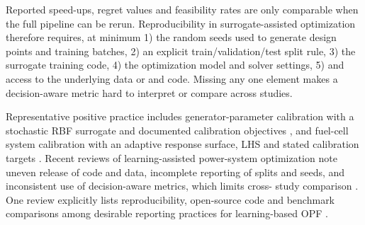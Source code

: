 Reported speed-ups, regret values and feasibility rates are only
comparable when the full pipeline can be rerun. Reproducibility in
surrogate-assisted optimization therefore requires, at minimum 1) the
random seeds used to generate design points and training batches, 2) an
explicit train/validation/test split rule, 3) the surrogate training
code, 4) the optimization model and solver settings, 5) and access to
the underlying data or and code. Missing any one element makes a
decision-aware metric hard to interpret or compare across studies.

Representative positive practice includes generator-parameter
calibration with a stochastic RBF surrogate and documented calibration
objectives \cite{Khazeiynasab2021}, and fuel-cell system calibration with an
adaptive response surface, LHS and stated calibration targets
\cite{Zhang2025__7}. Recent reviews of learning-assisted power-system
optimization note uneven release of code and data, incomplete reporting
of splits and seeds, and inconsistent use of decision-aware metrics,
which limits cross- study comparison
\cite{Ruan2021221,Khaloie2025,Lim2025,Mylonopoulos202332697}. One
review explicitly lists reproducibility, open-source code and benchmark
comparisons among desirable reporting practices for learning-based OPF
\cite{Khaloie2025}.
